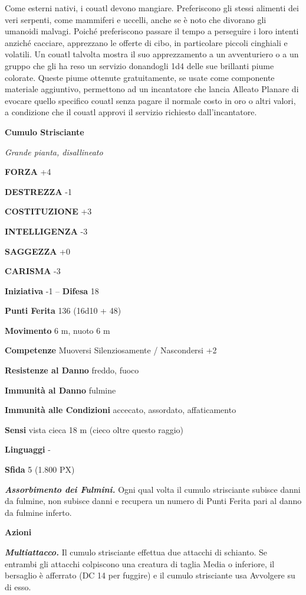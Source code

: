 \begin{multicols}{2}
Come esterni nativi, i couatl devono mangiare. Preferiscono gli stessi alimenti dei veri serpenti, come mammiferi e uccelli, anche se è noto che divorano gli umanoidi malvagi. Poiché preferiscono passare il tempo a perseguire i loro intenti anziché cacciare, apprezzano le offerte di cibo, in particolare piccoli cinghiali e volatili. Un couatl talvolta mostra il suo apprezzamento a un avventuriero o a un gruppo che gli ha reso un servizio donandogli 1d4 delle sue brillanti piume colorate. Queste piume ottenute gratuitamente, se usate come componente materiale aggiuntivo, permettono ad un incantatore che lancia Alleato Planare di evocare quello specifico couatl senza pagare il normale costo in oro o altri valori, a condizione che il couatl approvi il servizio richiesto dall'incantatore.

\medskip{}\textbf{Cumulo Strisciante}

\textit{Grande pianta, disallineato}

\textbf{FORZA} +4

\textbf{DESTREZZA} -1

\textbf{COSTITUZIONE} +3

\textbf{INTELLIGENZA} -3

\textbf{SAGGEZZA} +0

\textbf{CARISMA} -3

\textbf{Iniziativa} -1 -- \textbf{Difesa} 18

\textbf{Punti Ferita} 136 (16d10 + 48)

\textbf{Movimento} 6 m, nuoto 6 m

\textbf{Competenze} Muoversi Silenziosamente / Nascondersi +2

\textbf{Resistenze al Danno} freddo, fuoco

\textbf{Immunità al Danno} fulmine

\textbf{Immunità alle Condizioni} accecato, assordato, affaticamento

\textbf{Sensi} vista cieca 18 m (cieco oltre questo raggio)

\textbf{Linguaggi} -

\textbf{Sfida} 5 (1.800 PX)

\textit{\textbf{Assorbimento dei Fulmini.}} Ogni qual volta il cumulo strisciante subisce danni da fulmine, non subisce danni e recupera un numero di Punti Ferita pari al danno da fulmine inferto.

\textbf{Azioni}

\textit{\textbf{Multiattacco.}} Il cumulo strisciante effettua due attacchi di schianto. Se entrambi gli attacchi colpiscono una creatura di taglia Media o inferiore, il bersaglio è afferrato (DC 14 per fuggire) e il cumulo strisciante usa Avvolgere su di esso.


\end{multicols}

